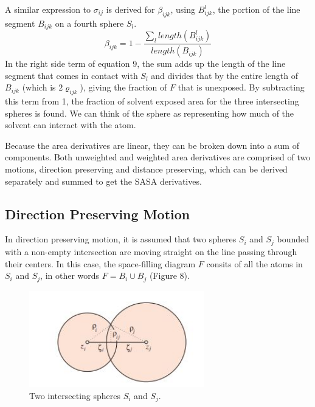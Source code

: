 \documentclass{article}
\newcommand{\R}{\mathbb{R}}
\begin{document}
A similar expression to $\sigma_{ij}$ is derived for $\beta_{ijk}$, using $B^l_{ijk}$, the portion of the line segment $B_{ijk}$ on a fourth sphere $S_l$. 
\begin{equation}
\beta_{ijk} = 1 - \frac{\sum_{l}length(B^l_{ijk})}{length(B_{ijk})}
\end{equation}
In the right side term of equation 9, the sum adds up the length of the line segment that comes in contact with $S_l$ and divides that by the entire length of $B_{ijk}$ (which is $2\varrho_{ijk}$), giving the fraction of $F$ that is unexposed. By subtracting this term from 1, the fraction of solvent exposed area for the three intersecting spheres is found. We can think of the sphere as representing how much of the solvent can interact with the atom. 

Because the area derivatives are linear, they can be broken down into a sum of components. Both unweighted and weighted area derivatives are comprised of two motions, direction preserving and distance preserving, which can be derived separately and summed to get the SASA derivatives.
 
\subsection{Direction Preserving Motion} 
In direction preserving motion, it is assumed that two spheres $S_i$ and $S_j$ bounded with a non-empty intersection are moving straight on the line passing through their centers.
In this case, the space-filling diagram $F$ consits of all the atoms in $S_i$ and $S_j$, in other words $F = B_i \cup B_j$ (Figure 8).

\begin{figure}[h!]
\caption{Two intersecting spheres $S_i$ and $S_j$.\cite{Bryant}}
\centerline{\includegraphics[width=3in]{Figure6}}
\end{figure}
\end{document}

